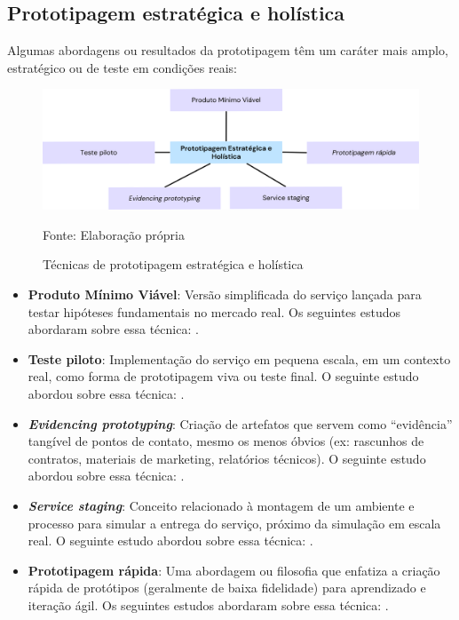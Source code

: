 \subsection{Prototipagem estratégica e holística}

Algumas abordagens ou resultados da prototipagem têm um caráter mais amplo, estratégico ou de teste em condições reais:

\begin{figure}[H]
	\centering
	\includegraphics[width=1\linewidth]{figuras/estrategica-holistica}
	\caption{Técnicas de prototipagem estratégica e holística}
	Fonte: Elaboração própria
	\label{fig:categorias-prototipacao}
\end{figure}

\begin{itemize}
	\item \textbf{Produto Mínimo Viável}: Versão simplificada do serviço lançada para testar hipóteses fundamentais no mercado real. Os seguintes estudos abordaram sobre essa técnica: .
	
	\item \textbf{Teste piloto}: Implementação do serviço em pequena escala, em um contexto real, como forma de prototipagem viva ou teste final. O seguinte estudo abordou sobre essa técnica: .
	
	\item \textbf{\textit{Evidencing prototyping}}: Criação de artefatos que servem como ``evidência'' tangível de pontos de contato, mesmo os menos óbvios (ex: rascunhos de contratos, materiais de marketing, relatórios técnicos). O seguinte estudo abordou sobre essa técnica: .
	
	\item \textbf{\textit{Service staging}}: Conceito relacionado à montagem de um ambiente e processo para simular a entrega do serviço, próximo da simulação em escala real. O seguinte estudo abordou sobre essa técnica: .
	
	\item \textbf{Prototipagem rápida}: Uma abordagem ou filosofia que enfatiza a criação rápida de protótipos (geralmente de baixa fidelidade) para aprendizado e iteração ágil. Os seguintes estudos abordaram sobre essa técnica: .
\end{itemize}

